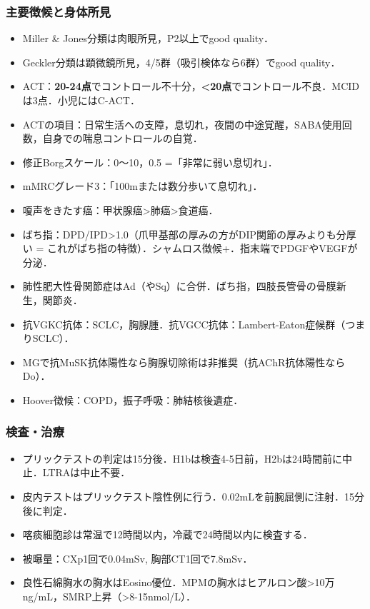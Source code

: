 \subsubsection{主要徴候と身体所見}
\begin{itemize}
\item Miller \& Jones分類は肉眼所見，P2以上でgood quality．

\item Geckler分類は顕微鏡所見，4/5群（吸引検体なら6群）でgood quality．

\item ACT：\textbf{20-24点}でコントロール不十分，\textbf{<20点}でコントロール不良．MCIDは3点．小児にはC-ACT．
\item ACTの項目：日常生活への支障，息切れ，夜間の中途覚醒，SABA使用回数，自身での喘息コントロールの自覚．
\item 修正Borgスケール：0〜10，0.5 =「非常に弱い息切れ」．
\item mMRCグレード3：「100mまたは数分歩いて息切れ」．

\item 嗄声をきたす癌：甲状腺癌>肺癌>食道癌．
\item ばち指：DPD/IPD>1.0（爪甲基部の厚みの方がDIP関節の厚みよりも分厚い = これがばち指の特徴）．シャムロス徴候+．指末端でPDGFやVEGFが分泌．
\item 肺性肥大性骨関節症はAd（やSq）に合併．ばち指，四肢長管骨の骨膜新生，関節炎．
\item 抗VGKC抗体：SCLC，胸腺腫．抗VGCC抗体：Lambert-Eaton症候群（つまりSCLC）．
\item MGで抗MuSK抗体陽性なら胸腺切除術は非推奨（抗AChR抗体陽性ならDo）．
\item Hoover徴候：COPD，振子呼吸：肺結核後遺症．

\end{itemize}
\subsubsection{検査・治療}

\begin{itemize}
\item プリックテストの判定は15分後．H1bは検査4-5日前，H2bは24時間前に中止．LTRAは中止不要．
\item 皮内テストはプリックテスト陰性例に行う．0.02mLを前腕屈側に注射．15分後に判定．

\item 喀痰細胞診は常温で12時間以内，冷蔵で24時間以内に検査する．
\item 被曝量：CXp1回で0.04mSv, 胸部CT1回で7.8mSv．

\item 良性石綿胸水の胸水はEosino優位．MPMの胸水はヒアルロン酸>10万ng/mL，SMRP上昇（>8-15nmol/L）．


\end{itemize}


